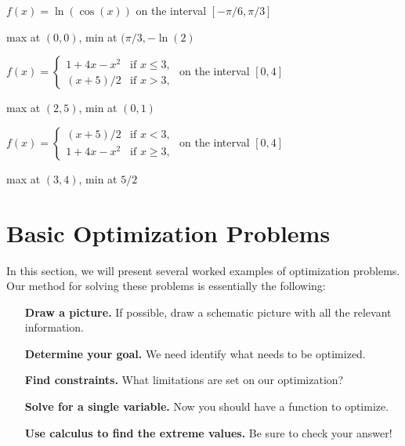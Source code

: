 \begin{exercises}
\begin{exercise}
$f(x) = \ln(\cos(x))$ on the interval $[-\pi/6,\pi/3]$
\begin{answer}
max at $(0,0)$, min at
$(\pi/3,-\ln(2)$
\end{answer}
\end{exercise}

\begin{exercise}
$f(x) = \begin{cases} 1 + 4 x -x^2 & \text{if  $x\leq 3$}, \\ 
(x+5)/2 &\text{if $x>3$},
\end{cases}$ on the interval $[0,4]$
\begin{answer} max at $(2,5)$, min at $(0,1)$
\end{answer}\end{exercise}


\begin{exercise}
$f(x) = \begin{cases} (x+5)/2 &\text{if $x<3$},\\
1 + 4 x -x^2 & \text{if  $x\ge 3$},
\end{cases}$ on the interval $[0,4]$
\begin{answer} max at $(3,4)$, min at $5/2$
\end{answer}\end{exercise}


\end{exercises}

















\section{Basic Optimization Problems}


In this section, we will present several worked examples of
optimization problems. Our method for solving these problems is
essentially the following:


\begin{guidelinesForOptimization}\hfil
\begin{itemize}
\item[\textbf{Draw a picture.}] If possible, draw a schematic picture with all the relevant information. 
\item[\textbf{Determine your goal.}] We need identify what needs to be
  optimized.
\item[\textbf{Find constraints.}] What limitations are set on our
  optimization?
\item[\textbf{Solve for a single variable.}] Now you should have a function to optimize.
\item[\textbf{Use calculus to find the extreme values.}] Be sure to check your answer!
\end{itemize}
\end{guidelinesForOptimization}


